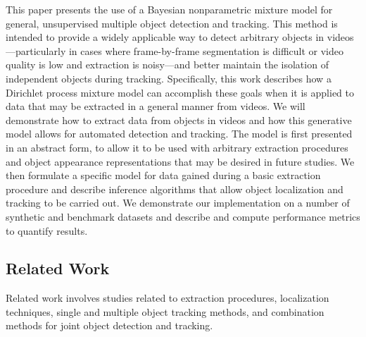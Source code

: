 \documentclass[smallcondensed, final]{svjour3}
\begin{document}
This paper presents the use of a Bayesian nonparametric mixture model for general, unsupervised multiple object detection and tracking. This method is intended to provide a widely applicable way to detect arbitrary objects in videos---particularly in cases where frame-by-frame segmentation is difficult or video quality is low and extraction is noisy---and better maintain the isolation of independent objects during tracking. Specifically, this work describes how a Dirichlet process mixture model can accomplish these goals when it is applied to data that may be extracted in a general manner from videos. We will demonstrate how to extract data from objects in videos and how this generative model allows for automated detection and tracking. The model is first presented in an abstract form, to allow it to be used with arbitrary extraction procedures and object appearance representations that may be desired in future studies. We then formulate a specific model for data gained during a basic extraction procedure and describe inference algorithms that allow object localization and tracking to be carried out. We demonstrate our implementation on a number of synthetic and benchmark datasets and describe and compute performance metrics to quantify results. 


\subsection{Related Work}
\label{sec:relatedwork}


Related work involves studies related to extraction procedures, localization techniques, single and multiple object tracking methods, and combination methods for joint object detection and tracking.
\end{document}

